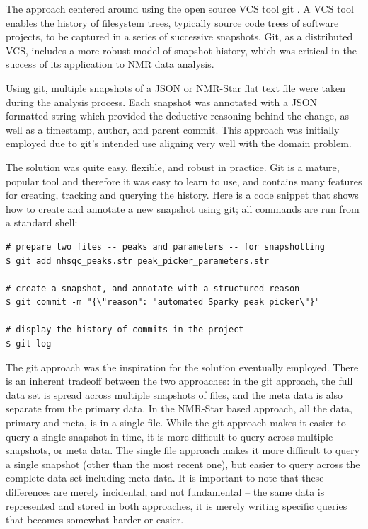 The approach centered around using the open source VCS tool git 
\cite{loeliger2012git}.  A VCS tool enables the history of filesystem trees,
typically source code trees of software projects, to be captured in a series
of successive snapshots.  Git, as a distributed VCS, includes a more robust
model of snapshot history, which was critical in the success of its 
application to NMR data analysis.

Using git, multiple snapshots of a JSON or NMR-Star flat text file were
taken during the analysis process.  Each snapshot was annotated with a 
JSON formatted string which provided the deductive reasoning behind the change,
as well as a timestamp, author, and parent commit.  This approach was initially
employed due to git's intended use aligning very well with the domain problem.

The solution was quite easy, flexible, and robust in practice.  Git is a mature,
popular tool and therefore it was easy to learn to use, and contains many
features for creating, tracking and querying the history.  Here is a code 
snippet that shows how to create and annotate a new snapshot using git; all
commands are run from a standard shell:
\begin{verbatim}
# prepare two files -- peaks and parameters -- for snapshotting
$ git add nhsqc_peaks.str peak_picker_parameters.str

# create a snapshot, and annotate with a structured reason
$ git commit -m "{\"reason": "automated Sparky peak picker\"}"

# display the history of commits in the project
$ git log
\end{verbatim}

The git approach was the inspiration for the solution eventually employed.
There is an inherent tradeoff between the two approaches: in the git approach,
the full data set is spread across multiple snapshots of files, and the meta
data is also separate from the primary data.  In the NMR-Star based approach,
all the data, primary and meta, is in a single file.  While the git approach
makes it easier to query a single snapshot in time, it is more difficult to
query across multiple snapshots, or meta data.  The single file approach makes
it more difficult to query a single snapshot (other than the most recent one),
but easier to query across the complete data set including meta data.  It is
important to note that these differences are merely incidental, and not 
fundamental -- the same data is represented and stored in both approaches, it
is merely writing specific queries that becomes somewhat harder or easier.

